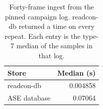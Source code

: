 \begin{table}[tbp]
\centering
\footnotesize
\caption{Forty-frame ingest from the pinned campaign log. readcon-db returned a time on every repeat. Each entry is the type-7 median of the samples in that log.}
\label{tab:rcdb}
\begin{tabular}{@{}lr@{}}
\toprule
Store & Median (s) \\
\midrule
readcon-db & 0.004858 \\
ASE database & 0.07064 \\
\bottomrule
\end{tabular}
\end{table}
